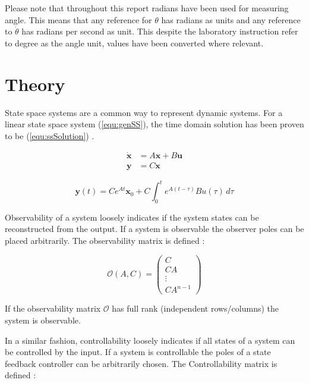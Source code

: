 \documentclass[a4paper, titlepage]{article}
\begin{document}
Please note that throughout this report radians have been used for measuring angle.
This means that any reference for $\theta$ has radians as units and any reference to $\dot{\theta}$ has radians per second as unit.
This despite the laboratory instruction refer to degree as the angle unit, values have been converted where relevant. 

\section{Theory}
State space systems are a common way to represent dynamic systems.
For a linear state space system (\ref{equ:genSS}), the time domain solution has been proven to be (\ref{equ:ssSolution}) \citep[~p.189]{astrom21}.

\begin{equation}
\begin{split}
\dot{\textbf{x}} &= A\textbf{x} + B\textbf{u} \\
\textbf{y} &= C\textbf{x}
\end{split}
\label{equ:genSS}
\end{equation}

\begin{equation}
\textbf{y}(t) = Ce^{At}\textbf{x}_0 + C \int_{0}^{t} e^{A(t-\tau)}Bu(\tau) \,d\tau
\label{equ:ssSolution}
\end{equation}

Observability of a system loosely indicates if the system states can be reconstructed from the output. If a system is observable the observer poles can be placed arbitrarily.
The observability matrix is defined \citep[p.~45]{glad00}:

\begin{equation}
\mathcal{O}(A,C) = 
\begin{pmatrix}
C \\ CA \\ \vdots \\ CA^{n-1}
\end{pmatrix}
\label{equ:obsv}
\end{equation}

If the observability matrix $\mathcal{O}$ has full rank (independent rows/columns) the system is observable.

In a similar fashion, controllability loosely indicates if all states of a system can be controlled by the input. If a system is controllable the poles of a state feedback controller can be arbitrarily chosen.
The Controllability matrix is defined \citep[p.~45]{glad00}:
\end{document}
